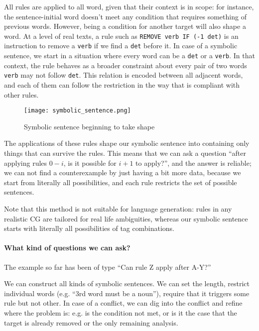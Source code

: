 All rules are applied to all word, given that their context is in scope: for instance, the sentence-initial word doesn't meet any condition that requires something of previous words.
However, being a condition for another target will also shape a word.
At a level of real texts, a rule such as \texttt{REMOVE verb IF (-1 det)} is an instruction to remove a \texttt{verb} if we find a \texttt{det} before it.
In case of a symbolic sentence, we start in a situation where every word can be a \texttt{det} or a \texttt{verb}. In that context, the rule behaves as a broader constraint about every pair of two words \texttt{verb} may not follow \texttt{det}. This relation is encoded between all adjacent words, and each of them can follow the restriction in the way that is compliant with other rules.

\begin{figure}[]

\texttt{[image: symbolic\_sentence.png]}

\caption{Symbolic sentence beginning to take shape}
\label{fig:example}
\end{figure}



The applications of these rules shape our symbolic sentence into containing only things that can survive the rules. This means that we can ask a question ``after applying rules $0-i$, is it possible for $i+1$ to apply?'', and the answer is reliable; we can not find a counterexample by just having a bit more data, because we start from literally all possibilities, and each rule
restricts the set of possible sentences.

Note that this method is not suitable for language generation: rules in any realistic CG are tailored for real life ambiguities, whereas our symbolic sentence starts with literally all possibilities of tag combinations.

\paragraph{What kind of questions we can ask?}

The example so far has been of type ``Can rule Z apply after A-Y?''

We can construct all kinds of symbolic sentences. We can set the length, restrict individual words (e.g. ``3rd word must be a noun''), require that it triggers some rule but not other.
In case of a conflict, we can dig into the conflict and refine where the problem is: e.g. is the condition not met, or is it the case that the target is already removed or the only remaining analysis.




